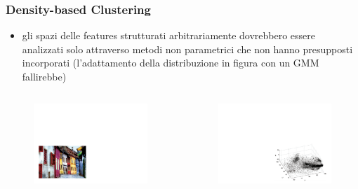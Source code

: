\begin{frame}

	\frametitle{{\color{GradientDescentDiagramRed}Density-based Clustering}}

		\begin{itemize}
			\item gli spazi delle features strutturati arbitrariamente dovrebbero essere analizzati solo attraverso metodi non parametrici che non hanno presupposti incorporati (l'adattamento della distribuzione in figura con un GMM fallirebbe)
		\end{itemize}

		\begin{columns}

			\begin{figure}[!htbp]
				\centering
				\includegraphics[width=1.0\linewidth]{images/unsupervised/non_parametric/np_1.pdf}
			\end{figure}

			\begin{figure}[!htbp]
				\centering
				\includegraphics[width=1.0\linewidth]{images/unsupervised/non_parametric/np_2.pdf}
			\end{figure}


\end{columns}
\end{frame}
